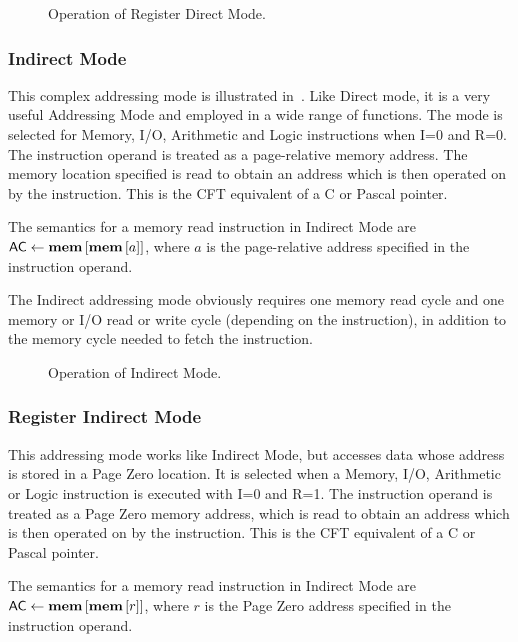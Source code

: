 \begin{figure}[htb]
 \centering
     
 \caption[Register Direct Mode]{\label{fig:register-direct-mode} Operation
   of Register Direct Mode.}
\end{figure}


\subsubsection{Indirect Mode}
\label{sec:indirect-mode}

This complex addressing mode is illustrated in~. Like
Direct mode, it is a very useful \gls{Addressing Mode} and employed in a wide
range of functions. The mode is selected for Memory, I/O, Arithmetic and Logic
instructions when I=0 and R=0. The instruction operand is treated as a
page-relative memory address. The memory location specified is read to obtain
an address which is then operated on by the instruction. This is the CFT
equivalent of a C or Pascal pointer.

The semantics for a memory read instruction in Indirect Mode are
$\mbox{\AC}\eq\memmem{a}$, where $a$ is the page-relative address specified in
the instruction operand.

The Indirect addressing mode obviously requires one memory read cycle and one memory or
I/O read or write cycle (depending on the instruction), in addition to the
memory cycle needed to fetch the instruction.


\begin{figure}[htb]
 \centering
 
 \caption[Indirect Mode]{\label{fig:indirect-mode} Operation
   of Indirect Mode.}
\end{figure}

\subsubsection{Register Indirect Mode}
\label{sec:register-indirect-mode}

This addressing mode works like Indirect Mode, but accesses data whose address
is stored in a Page Zero location. It is selected when a Memory, I/O,
Arithmetic or Logic instruction is executed with I=0 and R=1. The instruction
operand is treated as a Page Zero memory address, which is read to obtain an
address which is then operated on by the instruction. This is the CFT
equivalent of a C or Pascal pointer.

The semantics for a memory read instruction in Indirect Mode are
$\mbox{\AC}\eq\memmem{r}$, where $r$ is the Page Zero address specified in the
instruction operand.


